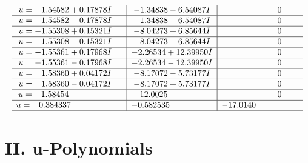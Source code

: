 \documentclass[1p]{elsarticle_modified}
\theoremstyle{definition}
\begin{document}
$$\begin{array}{c|c|c}
\begin{aligned}
u &= \phantom{-}1.54582 + 0.17878 I\end{aligned}
 & -1.34838 - 6.54087 I & \phantom{-0.000000 } 0 \\ \hline\begin{aligned}
u &= \phantom{-}1.54582 - 0.17878 I\end{aligned}
 & -1.34838 + 6.54087 I & \phantom{-0.000000 } 0 \\ \hline\begin{aligned}
u &= -1.55308 + 0.15321 I\end{aligned}
 & -8.04273 + 6.85644 I & \phantom{-0.000000 } 0 \\ \hline\begin{aligned}
u &= -1.55308 - 0.15321 I\end{aligned}
 & -8.04273 - 6.85644 I & \phantom{-0.000000 } 0 \\ \hline\begin{aligned}
u &= -1.55361 + 0.17968 I\end{aligned}
 & -2.26534 + 12.39950 I & \phantom{-0.000000 } 0 \\ \hline\begin{aligned}
u &= -1.55361 - 0.17968 I\end{aligned}
 & -2.26534 - 12.39950 I & \phantom{-0.000000 } 0 \\ \hline\begin{aligned}
u &= \phantom{-}1.58360 + 0.04172 I\end{aligned}
 & -8.17072 - 5.73177 I & \phantom{-0.000000 } 0 \\ \hline\begin{aligned}
u &= \phantom{-}1.58360 - 0.04172 I\end{aligned}
 & -8.17072 + 5.73177 I & \phantom{-0.000000 } 0 \\ \hline\begin{aligned}
u &= \phantom{-}1.58454\phantom{ +0.000000I}\end{aligned}
 & -12.0025\phantom{ +0.000000I} & \phantom{-0.000000 } 0 \\ \hline\begin{aligned}
u &= \phantom{-}0.384337\phantom{ +0.000000I}\end{aligned}
 & -0.582535\phantom{ +0.000000I} & -17.0140\phantom{ +0.000000I}\\
 \hline 
 \end{array}$$\newpage
\newpage\renewcommand{\arraystretch}{1}
\centering \section*{ II. u-Polynomials}
\end{document}
